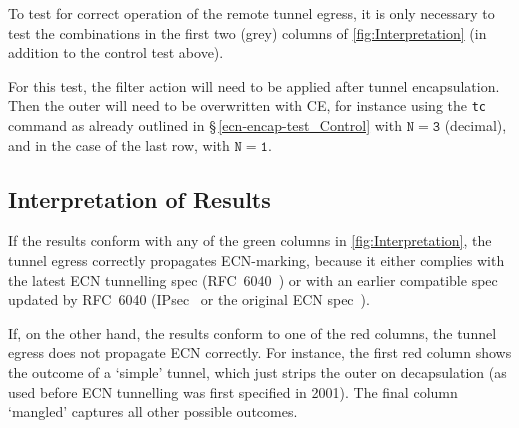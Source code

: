To test for correct operation of the remote tunnel egress, it is only necessary to test the combinations in the first two (grey) columns of \autoref{fig:Interpretation} (in addition to the control test above).
%

For this test, the filter action will need to be applied after tunnel encapsulation. Then the outer will need to be overwritten with CE, for instance using the \texttt{tc} command as already outlined in \S\,\ref{ecn-encap-test_Control} with \(\mathtt{N}=\mathtt{3}\) (decimal), and in the case of the last row, with \(\mathtt{N}=\mathtt{1}\).

\subsection{Interpretation of Results}\label{ecn-encap-test_Interpretation}

If the results conform with any of the green columns in \autoref{fig:Interpretation}, the tunnel egress correctly propagates ECN-marking, because it either complies with the latest ECN tunnelling spec (RFC~6040~\cite{Briscoe07b:ECN-tunnel}) or with an earlier compatible spec updated by RFC~6040 (IPsec~\cite{IETF_RFC4301:IPSEC_architecture} or the original ECN spec~\cite{rfc3168}).

If, on the other hand, the results conform to one of the red columns, the tunnel egress does not propagate ECN correctly. For instance, the first red column shows the outcome of a `simple' tunnel, which just strips the outer on decapsulation (as used before ECN tunnelling was first specified in 2001). The final column `mangled' captures all other possible outcomes.

